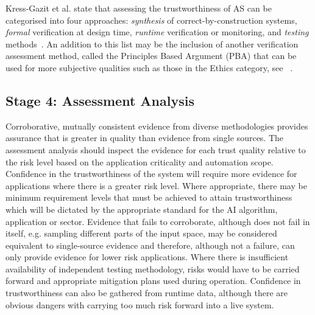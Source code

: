 Kress-Gazit et al. state that assessing the trustworthiness of AS can be categorised into four approaches: \emph{synthesis} of correct-by-construction systems, \emph{formal} verification at design time, \emph{runtime} verification or monitoring, and \emph{testing} methods~\cite{kress2021formalizing}. 
%
An addition to this list may be the inclusion of another verification assessment method, called the Principles Based Argument (PBA) that can be used for more subjective qualities such as those in the Ethics category, see ~\cite{Porter2022}. 
%
%
%


\subsection{Stage 4: Assessment Analysis}


Corroborative, mutually consistent evidence from diverse methodologies provides assurance that is greater in quality than evidence from single sources. 
%
The assessment analysis should inspect the evidence for each trust quality relative to the risk level based on the application criticality and automation scope. Confidence in the trustworthiness of the system will require more evidence for applications where there is a greater risk level. 
%
Where appropriate, there may be minimum requirement levels that must be achieved to attain trustworthiness which will be dictated by the appropriate standard for the AI algorithm, application or sector.  %
%
Evidence that fails to corroborate, although does not fail in itself, e.g. sampling different parts of the input space, may be considered equivalent to single-source evidence and therefore, although not a failure, can only provide evidence for lower risk applications. 
%
Where there is insufficient availability of independent testing methodology, risks would have to be carried forward and appropriate mitigation plans used during operation. Confidence in trustworthiness can also be gathered from runtime data, although there are obvious dangers with carrying too much risk forward into a live system.


